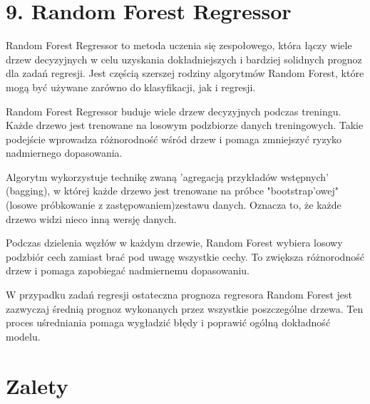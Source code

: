 {}
\justify
\fontsize{14}{16}\selectfont
\setlength{\parindent}{0pt}
\section*{9. Random Forest Regressor \cite{alma991000280759708832}}
\label{sec:machine_learning_overview}
\fontsize{12}{14}\selectfont
\vspace{-1.0em}

\hspace{1.5cm} Random Forest Regressor to metoda uczenia się zespołowego, która łączy wiele drzew decyzyjnych w celu uzyskania dokładniejszych i bardziej solidnych prognoz dla zadań regresji. Jest częścią szerszej rodziny algorytmów Random Forest, które mogą być używane zarówno do klasyfikacji, jak i regresji.

\hspace{1.5cm} Random Forest Regressor buduje wiele drzew decyzyjnych podczas treningu. Każde drzewo jest trenowane na losowym podzbiorze danych treningowych. Takie podejście wprowadza różnorodność wśród drzew i pomaga zmniejszyć ryzyko nadmiernego dopasowania.

\hspace{1.5cm} Algorytm wykorzystuje technikę zwaną 'agregacją przykładów wstępnych' (bagging), w której każde drzewo jest trenowane na próbce "bootstrap'owej" (losowe próbkowanie z zastępowaniem)zestawu danych. Oznacza to, że każde drzewo widzi nieco inną wersję danych.

\hspace{1.5cm} Podczas dzielenia węzłów w każdym drzewie, Random Forest wybiera losowy podzbiór cech zamiast brać pod uwagę wszystkie cechy. To zwiększa różnorodność drzew i pomaga zapobiegać nadmiernemu dopasowaniu.

\hspace{1.5cm} W przypadku zadań regresji ostateczna prognoza regresora Random Forest jest zazwyczaj średnią prognoz wykonanych przez wszystkie poszczególne drzewa. Ten proces uśredniania pomaga wygładzić błędy i poprawić ogólną dokładność modelu.

{}
\section*{Zalety }
\vspace{-1.0em}


